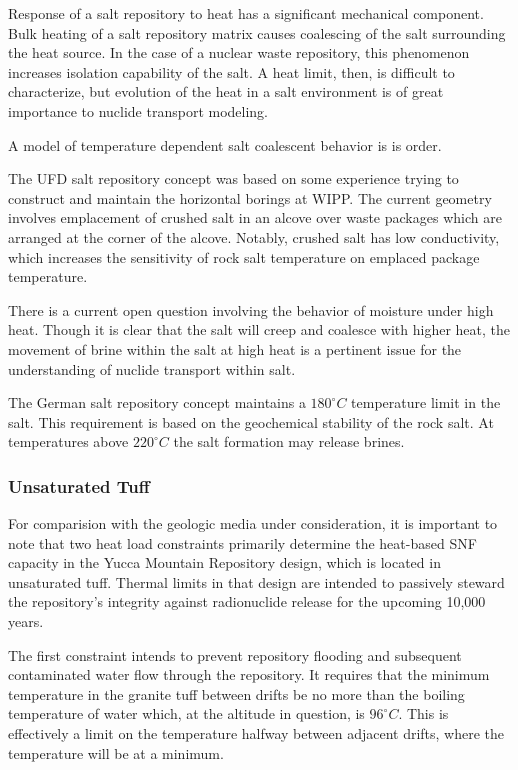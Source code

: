Response of a salt repository to heat has a significant
mechanical component. Bulk heating of a salt repository matrix causes
coalescing  of the salt surrounding the heat source. In the case of a nuclear
waste repository, this phenomenon increases isolation capability of the salt. A
heat limit, then, is difficult to characterize, but evolution of the heat in a
salt environment is of great importance to nuclide transport modeling. 

A model of temperature dependent salt coalescent behavior is is order. 

The \gls{UFD} salt repository concept was based on some 
experience trying to construct and maintain the horizontal borings at WIPP. The 
current geometry involves emplacement of crushed salt in an alcove over waste
packages which are arranged at the corner of the alcove. Notably,  crushed salt 
has low conductivity, which increases the sensitivity of rock salt temperature 
on emplaced package temperature. 

There is a current open question involving the behavior of moisture under high 
heat. Though it is clear that the salt will creep and coalesce with higher heat, 
the movement of brine within the salt at high heat is a pertinent issue for the 
understanding of nuclide transport within salt.

The German salt repository concept maintains a $180^\circ C$ temperature limit 
in the salt. This requirement is based on the geochemical stability of the rock  
salt. At temperatures above $220^\circ C$ the salt formation may release 
brines.\cite{von_lensa_red-impact_2008}\cite{brewitz_long_2002}


\subsubsection{Unsaturated Tuff}

For comparision with the geologic media under consideration, it is important to 
note that two heat load constraints primarily determine the heat-based SNF capacity
in the Yucca Mountain Repository design, which is located in unsaturated tuff.
Thermal limits in that design are intended to passively steward the
repository's integrity against radionuclide release for the upcoming 10,000
years.

The first constraint intends to prevent repository flooding and subsequent
contaminated water flow through the repository. It requires that the minimum
temperature in the granite tuff between drifts be no more than the boiling
temperature of water which, at the altitude in question, is $96^{\circ}C$. This
is effectively a limit on the temperature halfway between adjacent drifts,
where the temperature will be at a minimum.

